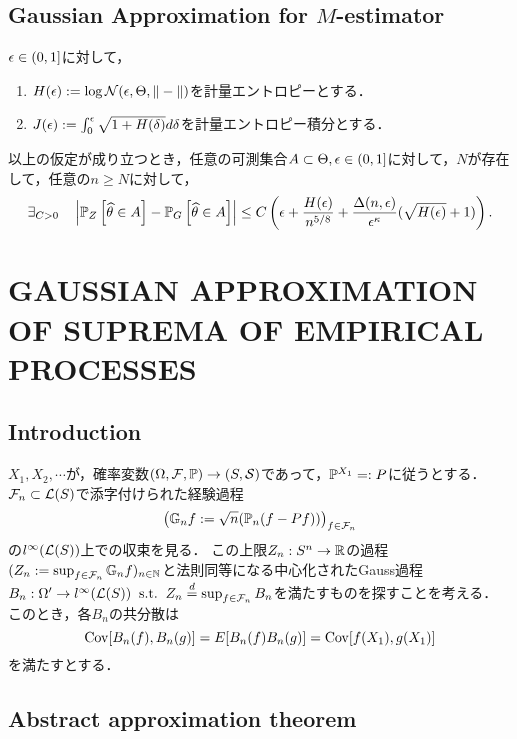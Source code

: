 \documentclass[uplatex,dvipdfmx]{jsreport}
\begin{document}
\subsection{Gaussian Approximation for $M$-estimator}

\begin{notation}
    $\epsilon\in(0,1]$に対して，
    \begin{enumerate}
        \item $H(\epsilon):=\log\mathcal{N}(\epsilon,\Theta,\|-\|)$を計量エントロピーとする．
        \item $J(\epsilon):=\int^\epsilon_0\sqrt{1+H(\delta)}d\delta$を計量エントロピー積分とする．
    \end{enumerate}
\end{notation}

\begin{theorem}
    以上の仮定が成り立つとき，任意の可測集合$A\subset\Theta,\epsilon\in(0,1]$に対して，$N$が存在して，任意の$n\ge N$に対して，
    \[\exists_{C>0}\quad \left|\mathbb{P}_Z\left[\widehat{\theta}\in A\right]-\mathbb{P}_G\left[\widehat{\theta}\in A\right]\right|\le C\left(\epsilon+\frac{H(\epsilon)}{n^{5/8}}+\frac{\Delta(n,\epsilon)}{\epsilon^\kappa}(\sqrt{H(\epsilon)}+1)\right).\]
\end{theorem}

\section{GAUSSIAN APPROXIMATION OF SUPREMA OF EMPIRICAL PROCESSES}

\subsection{Introduction}

\begin{notation}
    $X_1,X_2,\cdots$が，確率変数$(\Omega,\mathcal{F},\mathbb{P})\to(S,\mathcal{S})$であって，$\mathbb{P}^{X_1}=:P$に従うとする．
    $\mathcal{F}_n\subset\mathcal{L}(S)$で添字付けられた経験過程
    \[\left(\mathbb{G}_nf:=\sqrt{n}(\mathbb{P}_n(f-Pf))\right)_{f\in\mathcal{F}_n}\]
    の$l^\infty(\mathcal{L}(S))$上での収束を見る．
    この上限$Z_n:S^n\to\mathbb{R}$の過程$(Z_n:=\sup_{f\in\mathcal{F}_n}\mathbb{G}_nf)_{n\in\mathbb{N}}$と法則同等になる中心化されたGauss過程$B_n:\Omega'\to l^\infty(\mathcal{L}(S))\;\;\mathrm{s.t.}\;\;Z_n\overset{d}{=}\sup_{f\in\mathcal{F}_n}B_n$を満たすものを探すことを考える．
    このとき，各$B_n$の共分散は
    \[\mathrm{Cov}[B_n(f),B_n(g)]=E[B_n(f)B_n(g)]=\mathrm{Cov}[f(X_1),g(X_1)]\]
    を満たすとする．
\end{notation}

\subsection{Abstract approximation theorem}
\end{document}
